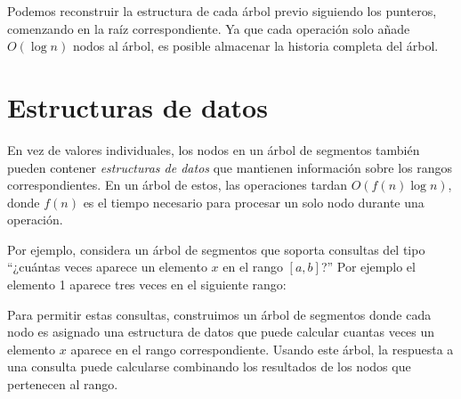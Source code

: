 Podemos reconstruir la estructura de cada árbol previo siguiendo los
punteros, comenzando en la raíz correspondiente. Ya que cada operación
solo añade $O(\log n)$ nodos al árbol, es posible almacenar la historia
completa del árbol.

\section{Estructuras de datos}

En vez de valores individuales, los nodos en un árbol de segmentos también
pueden contener \emph{estructuras de datos} que mantienen información sobre
los rangos correspondientes. En un árbol de estos, las operaciones tardan
$O(f(n) \log n)$, donde $f(n)$ es el tiempo necesario para procesar un
solo nodo durante una operación.

Por ejemplo, considera un árbol de segmentos que soporta consultas del tipo
``¿cuántas veces aparece un elemento $x$ en el rango $[a,b]$?'' Por ejemplo
el elemento 1 aparece tres veces en el siguiente rango:

\begin{center}
\end{center}

Para permitir estas consultas, construimos un árbol de segmentos donde
cada nodo es asignado una estructura de datos que puede calcular cuantas
veces un elemento $x$ aparece en el rango correspondiente. Usando este árbol,
la respuesta a una consulta puede calcularse combinando los resultados de
los nodos que pertenecen al rango.

